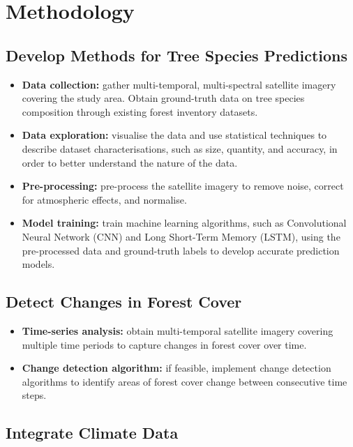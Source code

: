 \chapter{Methodology}

\section{Develop Methods for Tree Species Predictions}

\begin{itemize}
  \item \textbf{Data collection:} gather multi-temporal, multi-spectral satellite imagery covering the study area. Obtain ground-truth data on tree species composition through existing forest inventory datasets.

  \item \textbf{Data exploration:} visualise the data and use statistical techniques to describe dataset characterisations, such as size, quantity, and accuracy, in order to better understand the nature of the data.
  
  \item \textbf{Pre-processing:} pre-process the satellite imagery to remove noise, correct for atmospheric effects, and normalise.

  
  \item \textbf{Model training:} train machine learning algorithms, such as Convolutional Neural Network (CNN) and Long Short-Term Memory (LSTM), using the pre-processed data and ground-truth labels to develop accurate prediction models.
\end{itemize}

\section{Detect Changes in Forest Cover}

\begin{itemize}
  \item \textbf{Time-series analysis:} obtain multi-temporal satellite imagery covering multiple time periods to capture changes in forest cover over time.
  
  \item \textbf{Change detection algorithm:} if feasible, implement change detection algorithms to identify areas of forest cover change between consecutive time steps.
\end{itemize}

\section{Integrate Climate Data}

